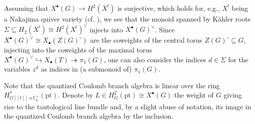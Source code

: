\documentclass[reqno]{amsart}
\numberwithin{equation}{section}
\numberwithin{equation}{section}
\numberwithin{equation}{section}
\theoremstyle{definition}
\theoremstyle{remark}
\theoremstyle{remark}
\begin{document}
Assuming that $X^\bullet(G) \to H^2(X^!)$ is surjective, which holds for, e.g., $X^!$ being a Nakajima quiver variety (cf. \cite{hyperkahler-kirwan}), we see that the monoid spanned by K\"ahler roots $\Sigma \subseteq H_2(X^!) \cong H^2(X^!)^\vee$ injects into $X^\bullet(G)^\vee$. Since $X^\bullet(G)^\vee \cong X_\bullet(Z(G)^\circ)$ are the coweights of the central torus $Z(G)^\circ \subseteq G$, injecting into the coweights of the maximal torus $X^\bullet(G)^\vee \hookrightarrow X_\bullet(T) \twoheadrightarrow \pi_1(G)$, one can also consider the indices $d \in \Sigma$ for the variables $z^d$ as indices in (a submonoid of) $\pi_1(G)$.


Note that the quantized Coulomb branch algebra is linear over the ring $H^*_{G[\![t]\!] \rtimes \mathbb{C}^\times_q} (\mathrm{pt})$. Denote by $L \in H^2_G(\mathrm{pt})\cong X^\bullet (G)$ the weight of $G$ giving rise to the tautological line bundle and, by a slight abuse of notation, its image in the quantized Coulomb branch algebra by the inclusion.
\end{document}

